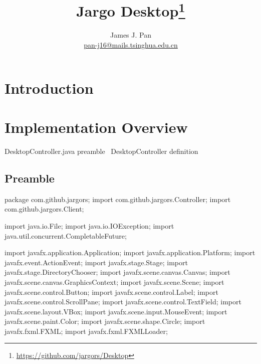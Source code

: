 \documentclass{article}
\title{Jargo Desktop\footnote{
    \url{https://github.com/jargors/Desktop}}}
\author{James J. Pan\\
  \small{\href{mailto:pan-j16@mails.tsinghua.edu.cn}{pan-j16@mails.tsinghua.edu.cn}}}
\def\nwendcode{\endtrivlist \endgroup}      %
\let\nwdocspar=\par
\begin{document}
\maketitle
\pagestyle{noweb}

\tableofcontents

\section{Introduction}
\label{sec:introduction}

\section{Implementation Overview}
\endmoddef{}
\LA{}DesktopController.java preamble~{\nwtagstyle{}}\RA{}
\LA{}\code{}DesktopController\edoc{} definition~{\nwtagstyle{}}\RA{}
\nwendcode{}\nwdocspar

\subsection{Preamble}
\nwenddocs{}\endmoddef{}
package com.github.jargors;
import com.github.jargors.Controller;
import com.github.jargors.Client;
\nwendcode{}\nwdocspar
\nwenddocs{}\plusendmoddef
import java.io.File;
import java.io.IOException;
import java.util.concurrent.CompletableFuture;
\nwendcode{}\nwdocspar
\nwenddocs{}\plusendmoddef
import javafx.application.Application;
import javafx.application.Platform;
import javafx.event.ActionEvent;
import javafx.stage.Stage;
import javafx.stage.DirectoryChooser;
import javafx.scene.canvas.Canvas;
import javafx.scene.canvas.GraphicsContext;
import javafx.scene.Scene;
import javafx.scene.control.Button;
import javafx.scene.control.Label;
import javafx.scene.control.ScrollPane;
import javafx.scene.control.TextField;
import javafx.scene.layout.VBox;
import javafx.scene.input.MouseEvent;
import javafx.scene.paint.Color;
import javafx.scene.shape.Circle;
import javafx.fxml.FXML;
import javafx.fxml.FXMLLoader;
\nwendcode{}\nwdocspar
\end{document}
